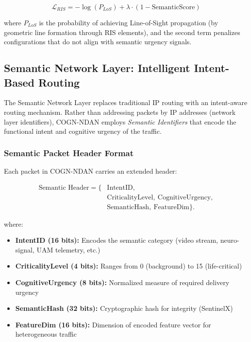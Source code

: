\documentclass{BVP_CINC}
\newcommand{\COGN}{COGN-NDAN}
\begin{document}
\begin{equation}
    \mathcal{L}_{RIS} = -\log(P_{LoS}) + \lambda \cdot (1 - \text{SemanticScore})
\end{equation}

where $P_{LoS}$ is the probability of achieving Line-of-Sight propagation (by geometric line formation through RIS elements), and the second term penalizes configurations that do not align with semantic urgency signals.

\subsection{Semantic Network Layer: Intelligent Intent-Based Routing}

The Semantic Network Layer replaces traditional IP routing with an intent-aware routing mechanism. Rather than addressing packets by IP addresses (network layer identifiers), \COGN{} employs \textit{Semantic Identifiers} that encode the functional intent and cognitive urgency of the traffic.

\subsubsection{Semantic Packet Header Format}
Each packet in \COGN{} carries an extended header:

\begin{equation}
\begin{aligned}
\text{Semantic Header} = \{&\text{IntentID},\\
&\text{CriticalityLevel},\ \text{CognitiveUrgency},\\
&\text{SemanticHash},\ \text{FeatureDim}\}.
\end{aligned}
\end{equation}

where:
\begin{itemize}
    \item \textbf{IntentID (16 bits):} Encodes the semantic category (video stream, neuro-signal, UAM telemetry, etc.)
    \item \textbf{CriticalityLevel (4 bits):} Ranges from 0 (background) to 15 (life-critical)
    \item \textbf{CognitiveUrgency (8 bits):} Normalized measure of required delivery urgency
    \item \textbf{SemanticHash (32 bits):} Cryptographic hash for integrity (SentinelX)
    \item \textbf{FeatureDim (16 bits):} Dimension of encoded feature vector for heterogeneous traffic
\end{itemize}
\end{document}
